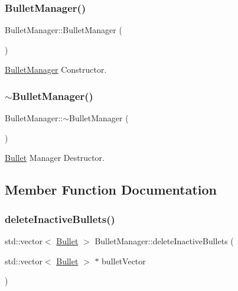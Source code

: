 \subsubsection{\texorpdfstring{Bullet\+Manager()}{BulletManager()}}
{\footnotesize\ttfamily Bullet\+Manager\+::\+Bullet\+Manager (\begin{DoxyParamCaption}{ }\end{DoxyParamCaption})}



\hyperlink{class_bullet_manager}{Bullet\+Manager} Constructor. 

\mbox{\label{class_bullet_manager_ae91d473833a2b3cc9bfb6180d3eb0099}} 
\subsubsection{\texorpdfstring{$\sim$\+Bullet\+Manager()}{~BulletManager()}}
{\footnotesize\ttfamily Bullet\+Manager\+::$\sim$\+Bullet\+Manager (\begin{DoxyParamCaption}{ }\end{DoxyParamCaption})\hspace{0.3cm}{\ttfamily [virtual]}}



\hyperlink{class_bullet}{Bullet} Manager Destructor. 



\subsection{Member Function Documentation}
\mbox{\label{class_bullet_manager_a834ec287e01fc2ed7c5d3885e4b380c6}} 
\subsubsection{\texorpdfstring{delete\+Inactive\+Bullets()}{deleteInactiveBullets()}}
{\footnotesize\ttfamily std\+::vector$<$ \hyperlink{class_bullet}{Bullet} $>$ Bullet\+Manager\+::delete\+Inactive\+Bullets (\begin{DoxyParamCaption}\item[{std\+::vector$<$ \hyperlink{class_bullet}{Bullet} $>$ $\ast$}]{bullet\+Vector }\end{DoxyParamCaption})}



